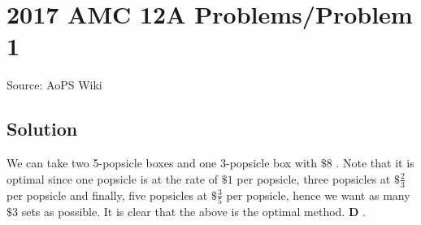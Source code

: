 \documentclass[12pt]{article}
\begin{document}
\section*{{2017 AMC 12A Problems/Problem 1}}
Source: AoPS Wiki

\subsection*{Solution}
We can take two 5-popsicle boxes and one 3-popsicle box with $\$8$ . Note that it is optimal since one popsicle is at the rate of $\$1$ per popsicle, three popsicles at $\$\frac{2}{3}$ per popsicle and finally, five popsicles at $\$\frac{3}{5}$ per popsicle, hence we want as many $\$3$ sets as possible. It is clear that the above is the optimal method. $\boxed{\textbf{D}}$ .
\end{document}
